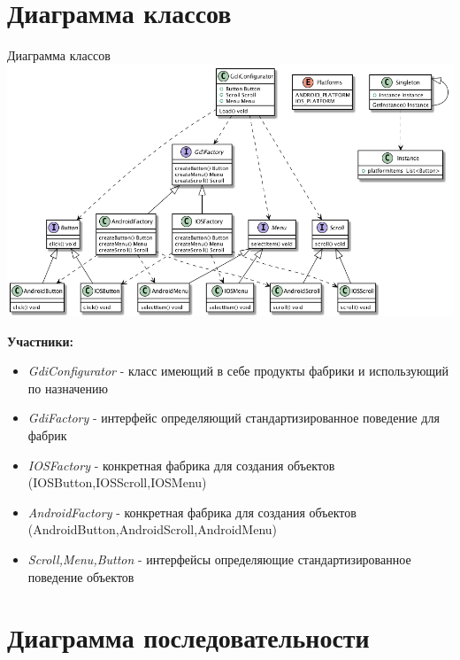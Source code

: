 \documentclass[PI,LAB]{HSEUniversity}
\begin{document}
\section{Диаграмма классов}
\begin{FIGURE}[h]{Диаграмма классов \label{fig:example-figure}}
	\includegraphics[width=\textwidth]{../out/diagrams/factory-go/factory-go}
\end{FIGURE}

\textbf{Участники:}
\begin{itemize}
	\item \emph{GdiConfigurator} - класс имеющий в себе продукты фабрики и использующий по назначению
	\item \emph{GdiFactory} - интерфейс определяющий стандартизированное поведение для фабрик
	\item \emph{IOSFactory} - конкретная фабрика для создания объектов  (IOSButton,IOSScroll,IOSMenu)
	\item \emph{AndroidFactory} - конкретная фабрика для создания объектов  (AndroidButton,AndroidScroll,AndroidMenu) 
	\item \emph{Scroll,Menu,Button} - интерфейсы определяющие стандартизированное  поведение объектов 
\end{itemize}


\section{Диаграмма последовательности }
\end{document}
